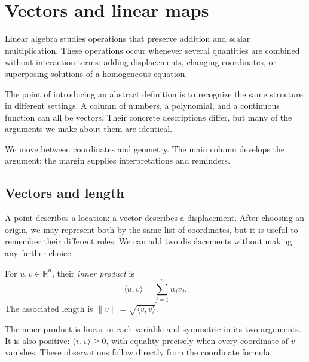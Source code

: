 \documentclass{hubbardbook}
\newcommand{\R}{\mathbb{R}}
\newcommand{\norm}[1]{\lVert #1\rVert}
\newcommand{\inner}[2]{\langle #1,#2\rangle}
\begin{document}
\mainmatter
\chapter{Vectors and linear maps}

\introsection
{}
Linear algebra studies operations that preserve addition and scalar
multiplication. These operations occur whenever several quantities are
combined without interaction terms: adding displacements, changing
coordinates, or superposing solutions of a homogeneous equation.

The point of introducing an abstract definition is to recognize the same
structure in different settings. A column of numbers, a polynomial, and a
continuous function can all be vectors. Their concrete descriptions differ,
but many of the arguments we make about them are identical.

We move between coordinates and geometry. The main column develops the
argument; the margin supplies interpretations and reminders.

\section{Vectors and length}
\label{sec:vectors}
A point describes a location; a vector describes a displacement. After
choosing an origin, we may represent both by the same list of coordinates,
but it is useful to remember their different roles. We can add two
displacements without making any further choice.

\begin{definition}\label{def:inner}
For \(u,v\in\R^n\), their \emph{inner product} is
\begin{equation}\label{eq:inner}
  \inner{u}{v}=\sum_{j=1}^{n}u_jv_j.
\end{equation}
The associated length is \(\norm{v}=\sqrt{\inner{v}{v}}\).
\end{definition}

The inner product is linear in each variable and symmetric in its two
arguments. It is also positive: \(\inner{v}{v}\geq0\), with equality
precisely when every coordinate of \(v\) vanishes. These observations
follow directly from the coordinate formula.
\end{document}
